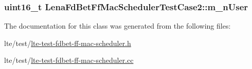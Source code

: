 \subsubsection[{\texorpdfstring{m\+\_\+n\+User}{m_nUser}}]{\setlength{\rightskip}{0pt plus 5cm}uint16\+\_\+t Lena\+Fd\+Bet\+Ff\+Mac\+Scheduler\+Test\+Case2\+::m\+\_\+n\+User\hspace{0.3cm}{\ttfamily [private]}}\hypertarget{classLenaFdBetFfMacSchedulerTestCase2_a626729804ff1d44917c7ba38b68b8b78}{}\label{classLenaFdBetFfMacSchedulerTestCase2_a626729804ff1d44917c7ba38b68b8b78}


The documentation for this class was generated from the following files\+:\begin{DoxyCompactItemize}
\item 
lte/test/\hyperlink{lte-test-fdbet-ff-mac-scheduler_8h}{lte-\/test-\/fdbet-\/ff-\/mac-\/scheduler.\+h}\item 
lte/test/\hyperlink{lte-test-fdbet-ff-mac-scheduler_8cc}{lte-\/test-\/fdbet-\/ff-\/mac-\/scheduler.\+cc}\end{DoxyCompactItemize}
